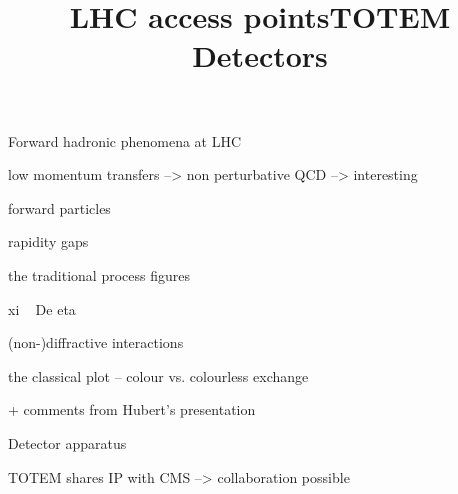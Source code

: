 Forward hadronic phenomena at LHC

\> low momentum transfers --> non perturbative QCD --> interesting

\> forward particles

\> rapidity gaps

\> the traditional process figures

\> xi ~ De eta


\newpage %
\title{}

(non-)diffractive interactions

the classical plot -- colour vs. colourless exchange 

\newpage %
\title{}


+ comments from Hubert's presentation

\newpage %
\hbox{}
\vfil

\vskip2mm
\centerline{\PartFont\cYe Detector apparatus\cFg}

\vfil


\newpage %
\title{LHC access points}


\> TOTEM shares IP with CMS --> collaboration possible

\newpage %
\title{TOTEM Detectors}

\vfil



